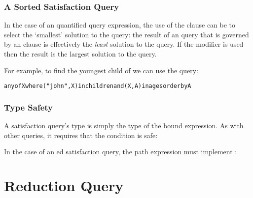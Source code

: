 \subsubsection{A Sorted Satisfaction Query}
In the case of an  quantified query expression, the use of the  clause can be to select the `smallest' solution to the query: the result of an  query that is governed by an  clause is effectively the \emph{least} solution to the query. If the  modifier is used then the result is the largest solution to the query.

For example, to find the youngest child of  we can use the query:
\begin{alltt}
anyof X where ("john",X) in children and (X,A) in ages order by A
\end{alltt}

\subsubsection{Type Safety}
A satisfaction query's type is simply the type of the bound expression. As with other queries, it requires that the condition is safe:
\begin{prooftree}
\end{prooftree}

\begin{prooftree}
\end{prooftree}

In the case of an ed satisfaction query, the path expression must implement :
\begin{prooftree}
\end{prooftree}

\section{Reduction Query}
\label{reductionQuery}

